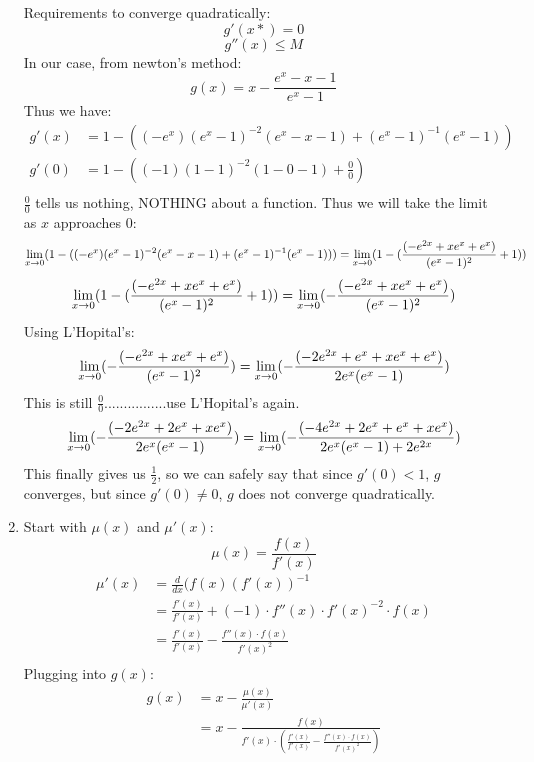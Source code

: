 \documentclass{article}
\begin{document}
\begin{enumerate}[label=\alph*.)]
Requirements to converge quadratically: \\
\[
g'(x*) = 0
\]
\[
g''(x) \leq M
\]
In our case, from newton's method: \\
\[
g(x) = x - \frac{e^x - x - 1}{e^x - 1}
\]
Thus we have:
\begin{align*}
g'(x) &= 1 - ((-e^x)(e^x-1)^{-2}(e^x-x-1) + (e^x - 1)^{-1}(e^x - 1)) \\
g'(0) &= 1 - ((-1)(1-1)^{-2}(1-0 - 1) + \frac{0}{0}) \\
\end{align*}
$\frac{0}{0}$ tells us nothing, NOTHING about a function. Thus we will take the limit as $x$ approaches 0: \\
\[
\lim_{x \rightarrow 0}( 1 - ((-e^x)(e^x-1)^{-2}(e^x-x-1) + (e^x - 1)^{-1}(e^x - 1))) = \lim_{x \rightarrow 0}(1 - (\frac{(-e^{2x} + xe^x+e^x)}{(e^x-1)^{2}} + 1)) \\
\]
\[
\lim_{x \rightarrow 0}(1 - (\frac{(-e^{2x} + xe^x+e^x)}{(e^x-1)^{2}} + 1)) =  \lim_{x \rightarrow 0}(-\frac{(-e^{2x} + xe^x+e^x)}{(e^x-1)^{2}}) \\
\]
Using L'Hopital's:\\
\[
 \lim_{x \rightarrow 0}(-\frac{(-e^{2x} + xe^x+e^x)}{(e^x-1)^{2}}) =  \lim_{x \rightarrow 0}(-\frac{(-2e^{2x} + e^x + xe^x+e^x)}{2e^x(e^x-1)})\\
\]
This is still $\frac{0}{0}$................use L'Hopital's again. \\
\[
 \lim_{x \rightarrow 0}(-\frac{(-2e^{2x} + 2e^x + xe^x)}{2e^x(e^x-1)}) =  \lim_{x \rightarrow 0}(-\frac{(-4e^{2x} + 2e^x + e^x + xe^x)}{2e^x(e^x-1) + 2e^{2x}})\\
\]
This finally gives us $\frac{1}{2}$, so we can safely say that since $g'(0) < 1$, $g$ converges, but since $g'(0) \neq 0$, $g$ does not converge quadratically.
\item Start with $\mu(x)$ and $\mu'(x)$:
\[
\mu(x) = \frac{f(x)}{f'(x)}
\]
\begin{align*}
\mu'(x) &=\frac{d}{dx}(f(x)(f'(x))^{-1} \\
&= \frac{f'(x)}{f'(x)} + (-1)\cdot f''(x) \cdot f'(x)^{-2} \cdot f(x) \\
&= \frac{f'(x)}{f'(x)} - \frac{f''(x) \cdot f(x)}{f'(x)^2}\\
\end{align*}
Plugging into $g(x)$: \\
\begin{align*}
g(x) &= x - \frac{\mu(x)}{\mu'(x)} \\
&= x - \frac{f(x)}{f'(x) \cdot ( \frac{f'(x)}{f'(x)} - \frac{f''(x) \cdot f(x)}{f'(x)^2})}\\

\end{align*}
\end{enumerate}
\end{document}
